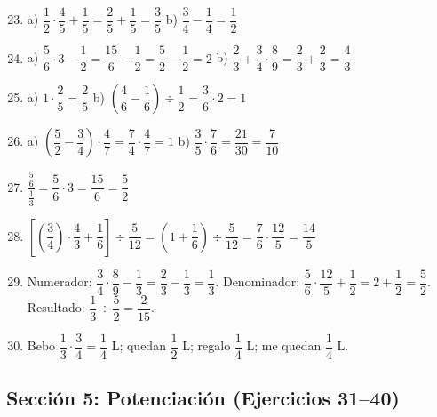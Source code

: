 \documentclass[12pt, letterpaper]{article}
\begin{document}
  \begin{enumerate}[leftmargin=*, label=\textbf{\arabic*.}]
    \setcounter{enumi}{22}
    \item a) $\dfrac{1}{2} \cdot \dfrac{4}{5} + \dfrac{1}{5} = \dfrac{2}{5} + \dfrac{1}{5} = \dfrac{3}{5}$ \quad b) $\dfrac{3}{4} - \dfrac{1}{4} = \dfrac{1}{2}$

    \item a) $\dfrac{5}{6} \cdot 3 - \dfrac{1}{2} = \dfrac{15}{6} - \dfrac{1}{2} = \dfrac{5}{2} - \dfrac{1}{2} = 2$ \quad b) $\dfrac{2}{3} + \dfrac{3}{4} \cdot \dfrac{8}{9} = \dfrac{2}{3} + \dfrac{2}{3} = \dfrac{4}{3}$

    \item a) $1 \cdot \dfrac{2}{5} = \dfrac{2}{5}$ \quad b) $\left(\dfrac{4}{6} - \dfrac{1}{6}\right) \div \dfrac{1}{2} = \dfrac{3}{6} \cdot 2 = 1$

    \item a) $\left(\dfrac{5}{2} - \dfrac{3}{4}\right) \cdot \dfrac{4}{7} = \dfrac{7}{4} \cdot \dfrac{4}{7} = 1$ \quad b) $\dfrac{3}{5} \cdot \dfrac{7}{6} = \dfrac{21}{30} = \dfrac{7}{10}$

    \item $\dfrac{\frac{5}{6}}{\frac{1}{3}} = \dfrac{5}{6} \cdot 3 = \dfrac{15}{6} = \dfrac{5}{2}$

    \item $\left[\left(\dfrac{3}{4}\right) \cdot \dfrac{4}{3} + \dfrac{1}{6}\right] \div \dfrac{5}{12} = \left(1 + \dfrac{1}{6}\right) \div \dfrac{5}{12} = \dfrac{7}{6} \cdot \dfrac{12}{5} = \dfrac{14}{5}$

    \item Numerador: $\dfrac{3}{4} \cdot \dfrac{8}{9} - \dfrac{1}{3} = \dfrac{2}{3} - \dfrac{1}{3} = \dfrac{1}{3}$. Denominador: $\dfrac{5}{6} \cdot \dfrac{12}{5} + \dfrac{1}{2} = 2 + \dfrac{1}{2} = \dfrac{5}{2}$. Resultado: $\dfrac{1}{3} \div \dfrac{5}{2} = \dfrac{2}{15}$.

    \item Bebo $\dfrac{1}{3} \cdot \dfrac{3}{4} = \dfrac{1}{4}$ L; quedan $\dfrac{1}{2}$ L; regalo $\dfrac{1}{4}$ L; me quedan $\dfrac{1}{4}$ L.
  \end{enumerate}

  \newpage

  \subsection*{Sección 5: Potenciación (Ejercicios 31--40)}
\end{document}
